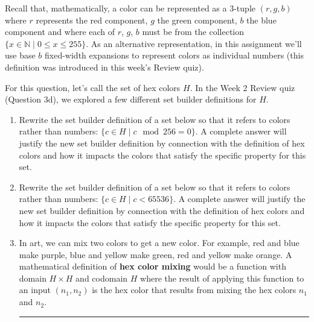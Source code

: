\begin{enumerate}[labelindent=0pt, leftmargin=0pt]
Recall that, mathematically, a color can be represented as a $3$-tuple $(r, g, b)$ 
where $r$ represents the red component, $g$ the green component, $b$ the blue component and where each of $r$, $g$, $b$ must be from the collection $\{x \in \mathbb{N}\mid 0 \leq x \leq 255 \}$.
As an alternative representation, in this assignment
we'll use base $b$ fixed-width expansions to represent colors
as individual numbers (this definition was introduced in this week's Review quiz).



For this question, let's call the set of hex colors $H$. In the Week 2 Review quiz (Question 3d), 
we explored a few different set builder definitions for $H$.

\begin{enumerate}
\item \gradeComplete Rewrite the set builder definition of a set below so that it 
refers to colors rather than numbers: $\{ c \in H \mid c \mod 256 = 0\}$. A complete answer will 
justify the new set builder definition by connection with the definition of hex colors and how it impacts
the colors that satisfy the specific property for this set.
\item \gradeCorrect Rewrite the set builder definition of a set below so that it 
refers to colors rather than numbers: $\{ c \in H \mid c < 65536\}$. A complete answer will 
justify the new set builder definition by connection with the definition of hex colors and how it impacts
the colors that satisfy the specific property for this set.
\item \gradeCorrect In art, we can mix two colors to get a new color. For example, red and blue make 
purple, blue and yellow make green, red and yellow make orange. 
A mathematical definition of {\bf hex color mixing} would be a function with domain $H \times H$
and codomain $H$ where the result of applying this function to an input $(n_1, n_2)$ is the hex color
that results from mixing the hex colors $n_1$ and $n_2$.


\rule{0.5\textwidth}{.4pt}


\end{enumerate}
\end{enumerate}
